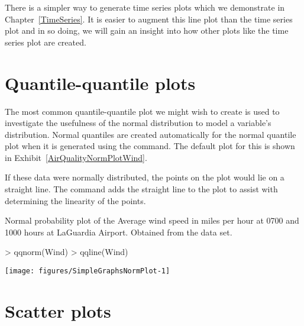 There is a simpler way to generate time series plots which we demonstrate in Chapter~\ref{TimeSeries}. It is easier to augment this line plot than the time series plot and in so doing, we will gain an insight into how other plots like the time series plot are created. 
 
 
\section{Quantile-quantile plots} 
 
The most common quantile-quantile plot we might wish to create is used to investigate the usefulness of the normal distribution to model a variable's distribution. Normal quantiles are created automatically for the normal quantile plot when it is generated using the  command. The default plot for this is shown in Exhibit~\ref{AirQualityNormPlotWind}. 
 
If these data were normally distributed, the points on the plot would lie on a straight line. The  command adds the straight line to the plot to assist with determining the linearity of the points. 
 
\begin{exhibit} 
\begin{center} 
\caption{Normal probability plot of the Average wind speed in miles per hour at 0700 and 1000 hours at LaGuardia Airport. Obtained from the  data set.} 
\label{AirQualityNormPlotWind} 
\begin{Schunk}
\begin{Sinput}
> qqnorm(Wind) 
> qqline(Wind) 
\end{Sinput}

\texttt{[image: figures/SimpleGraphsNormPlot-1]} \end{Schunk}
\end{center} 
\end{exhibit} 
 
\section{Scatter plots} 
 
